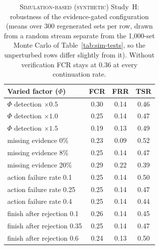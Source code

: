 \begin{table}[t]
\centering
\caption{\textsc{Simulation-based (synthetic)} Study~H: robustness of the evidence-gated configuration (means over 300 regenerated sets per row, drawn from a random stream separate from the 1{,}000-set Monte Carlo of Table~\ref{tab:sim-tests}, so the unperturbed rows differ slightly from it). Without verification FCR stays at 0.36 at every continuation rate.}
\label{tab:sim-sens}
\scriptsize
\setlength{\tabcolsep}{3pt}
\begin{tabular}{@{}lccc@{}}
\toprule
Varied factor ($\Phi$) & FCR & FRR & TSR \\
\midrule
$\Phi$ detection $\times0.5$ & 0.30 & 0.14 & 0.46 \\
$\Phi$ detection $\times1.0$ & 0.25 & 0.14 & 0.47 \\
$\Phi$ detection $\times1.5$ & 0.19 & 0.13 & 0.49 \\
missing evidence 0\% & 0.23 & 0.09 & 0.52 \\
missing evidence 8\% & 0.25 & 0.14 & 0.47 \\
missing evidence 20\% & 0.29 & 0.22 & 0.39 \\
action failure rate 0.1 & 0.25 & 0.14 & 0.50 \\
action failure rate 0.25 & 0.25 & 0.14 & 0.47 \\
action failure rate 0.4 & 0.25 & 0.14 & 0.44 \\
finish after rejection 0.1 & 0.26 & 0.14 & 0.45 \\
finish after rejection 0.35 & 0.25 & 0.14 & 0.47 \\
finish after rejection 0.6 & 0.24 & 0.13 & 0.50 \\
\bottomrule
\end{tabular}
\end{table}
